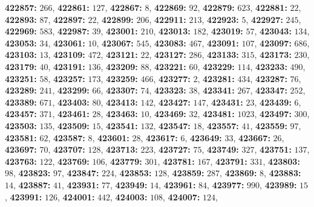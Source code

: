 \textsf{\bfseries 422857:} $266$, \textsf{\bfseries 422861:} $127$, \textsf{\bfseries 422867:} $8$, \textsf{\bfseries 422869:} $92$, \textsf{\bfseries 422879:} $623$, \textsf{\bfseries 422881:} $22$, \textsf{\bfseries 422893:} $87$, \textsf{\bfseries 422897:} $22$, \textsf{\bfseries 422899:} $206$, \textsf{\bfseries 422911:} $213$, \textsf{\bfseries 422923:} $5$, \textsf{\bfseries 422927:} $245$, \textsf{\bfseries 422969:} $583$, \textsf{\bfseries 422987:} $39$, \textsf{\bfseries 423001:} $210$, \textsf{\bfseries 423013:} $182$, \textsf{\bfseries 423019:} $57$, \textsf{\bfseries 423043:} $134$, \textsf{\bfseries 423053:} $34$, \textsf{\bfseries 423061:} $10$, \textsf{\bfseries 423067:} $545$, \textsf{\bfseries 423083:} $467$, \textsf{\bfseries 423091:} $107$, \textsf{\bfseries 423097:} $686$, \textsf{\bfseries 423103:} $13$, \textsf{\bfseries 423109:} $472$, \textsf{\bfseries 423121:} $22$, \textsf{\bfseries 423127:} $286$, \textsf{\bfseries 423133:} $315$, \textsf{\bfseries 423173:} $230$, \textsf{\bfseries 423179:} $40$, \textsf{\bfseries 423191:} $136$, \textsf{\bfseries 423209:} $88$, \textsf{\bfseries 423221:} $60$, \textsf{\bfseries 423229:} $114$, \textsf{\bfseries 423233:} $490$, \textsf{\bfseries 423251:} $58$, \textsf{\bfseries 423257:} $173$, \textsf{\bfseries 423259:} $466$, \textsf{\bfseries 423277:} $2$, \textsf{\bfseries 423281:} $434$, \textsf{\bfseries 423287:} $76$, \textsf{\bfseries 423289:} $241$, \textsf{\bfseries 423299:} $66$, \textsf{\bfseries 423307:} $74$, \textsf{\bfseries 423323:} $38$, \textsf{\bfseries 423341:} $267$, \textsf{\bfseries 423347:} $252$, \textsf{\bfseries 423389:} $671$, \textsf{\bfseries 423403:} $80$, \textsf{\bfseries 423413:} $142$, \textsf{\bfseries 423427:} $147$, \textsf{\bfseries 423431:} $23$, \textsf{\bfseries 423439:} $6$, \textsf{\bfseries 423457:} $371$, \textsf{\bfseries 423461:} $28$, \textsf{\bfseries 423463:} $10$, \textsf{\bfseries 423469:} $32$, \textsf{\bfseries 423481:} $1023$, \textsf{\bfseries 423497:} $300$, \textsf{\bfseries 423503:} $135$, \textsf{\bfseries 423509:} $15$, \textsf{\bfseries 423541:} $132$, \textsf{\bfseries 423547:} $18$, \textsf{\bfseries 423557:} $41$, \textsf{\bfseries 423559:} $97$, \textsf{\bfseries 423581:} $62$, \textsf{\bfseries 423587:} $8$, \textsf{\bfseries 423601:} $28$, \textsf{\bfseries 423617:} $6$, \textsf{\bfseries 423649:} $33$, \textsf{\bfseries 423667:} $26$, \textsf{\bfseries 423697:} $70$, \textsf{\bfseries 423707:} $128$, \textsf{\bfseries 423713:} $223$, \textsf{\bfseries 423727:} $75$, \textsf{\bfseries 423749:} $327$, \textsf{\bfseries 423751:} $137$, \textsf{\bfseries 423763:} $122$, \textsf{\bfseries 423769:} $106$, \textsf{\bfseries 423779:} $301$, \textsf{\bfseries 423781:} $167$, \textsf{\bfseries 423791:} $331$, \textsf{\bfseries 423803:} $98$, \textsf{\bfseries 423823:} $97$, \textsf{\bfseries 423847:} $224$, \textsf{\bfseries 423853:} $128$, \textsf{\bfseries 423859:} $287$, \textsf{\bfseries 423869:} $8$, \textsf{\bfseries 423883:} $14$, \textsf{\bfseries 423887:} $41$, \textsf{\bfseries 423931:} $77$, \textsf{\bfseries 423949:} $14$, \textsf{\bfseries 423961:} $84$, \textsf{\bfseries 423977:} $990$, \textsf{\bfseries 423989:} $15$, \textsf{\bfseries 423991:} $126$, \textsf{\bfseries 424001:} $442$, \textsf{\bfseries 424003:} $108$, \textsf{\bfseries 424007:} $124$, 
